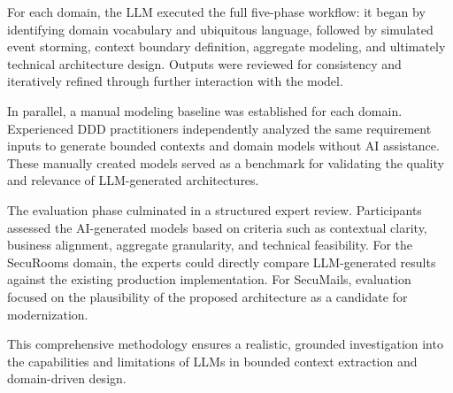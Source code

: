 For each domain, the LLM executed the full five-phase workflow: it began by identifying domain vocabulary and ubiquitous language, followed by simulated event storming, context boundary definition, aggregate modeling, and ultimately technical architecture design. Outputs were reviewed for consistency and iteratively refined through further interaction with the model.

In parallel, a manual modeling baseline was established for each domain. Experienced DDD practitioners independently analyzed the same requirement inputs to generate bounded contexts and domain models without AI assistance. These manually created models served as a benchmark for validating the quality and relevance of LLM-generated architectures.

The evaluation phase culminated in a structured expert review. Participants assessed the AI-generated models based on criteria such as contextual clarity, business alignment, aggregate granularity, and technical feasibility. For the SecuRooms domain, the experts could directly compare LLM-generated results against the existing production implementation. For SecuMails, evaluation focused on the plausibility of the proposed architecture as a candidate for modernization.

This comprehensive methodology ensures a realistic, grounded investigation into the capabilities and limitations of LLMs in bounded context extraction and domain-driven design.